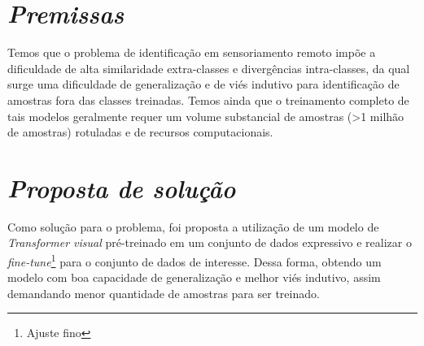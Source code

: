 



\section{\textit{Premissas}}\label{sec:Cap3_Premissas}

Temos que o problema de identificação em sensoriamento remoto impõe a dificuldade de alta similaridade extra-classes e divergências intra-classes, da qual surge uma dificuldade de generalização e de viés indutivo para identificação de amostras fora das classes treinadas. Temos ainda que o treinamento completo de tais modelos geralmente requer um volume substancial de amostras (>1 milhão de amostras) rotuladas e de recursos computacionais. 



\section{\textit{Proposta de solução}}\label{sec:Cap3_Proposta}

Como solução para o problema, foi proposta a utilização de um modelo de \textit{Transformer visual}  pré-treinado em um conjunto de dados expressivo e realizar o \textit{fine-tune}\footnote{Ajuste fino} para o conjunto de dados de interesse. Dessa forma, obtendo um modelo com boa capacidade de generalização e melhor viés indutivo, assim demandando menor quantidade de amostras para ser treinado.

